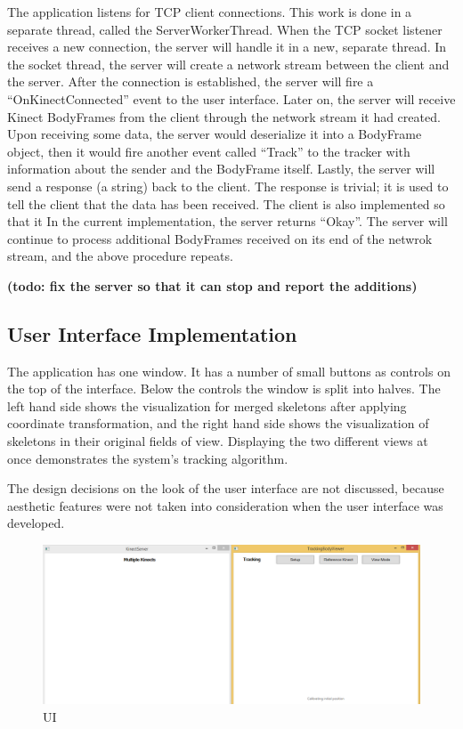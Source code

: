 \documentclass{sigchi}
\begin{document}
The application listens for TCP client connections. This work is done in a separate thread, called the ServerWorkerThread. When the TCP socket listener receives a new connection, the server will handle it in a new, separate thread. In the socket thread, the server will create a network stream between the client and the server. After the connection is established, the server will fire a ``OnKinectConnected'' event to the user interface. Later on, the server will receive Kinect BodyFrames from the client through the network stream it had created. Upon receiving some data, the server would deserialize it into a BodyFrame object, then it would fire another event called ``Track'' to the tracker with information about the sender and the BodyFrame itself. Lastly, the server will send a response (a string) back to the client. The response is trivial; it is used to tell the client that the data has been received. The client is also implemented so that it In the current implementation, the server returns ``Okay''. The server will continue to process additional BodyFrames received on its end of the netwrok stream, and the above procedure repeats.

\textbf{(todo: fix the server so that it can stop and report the additions)}

\subsection{User Interface Implementation}

The application has one window. It has a number of small buttons as controls on the top of the interface. Below the controls the window is split into halves. The left hand side shows the visualization for merged skeletons after applying coordinate transformation, and the right hand side shows the visualization of skeletons in their original fields of view. Displaying the two different views at once demonstrates the system's tracking algorithm.

The design decisions on the look of the user interface are not discussed, because aesthetic features were not taken into consideration when the user interface was developed.

\begin{figure}[!h]
  \centering
  \includegraphics[width=0.9\columnwidth]{ui}
  \caption{UI}
  \label{fig:ui}
\end{figure}
\end{document}
